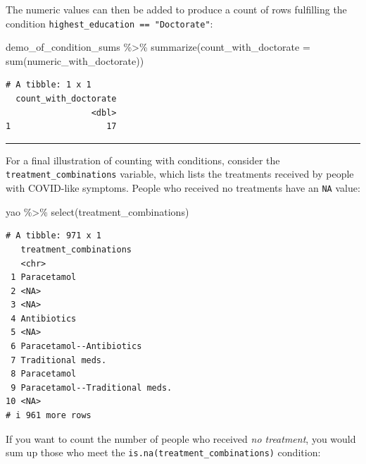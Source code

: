 \documentclass[
  letterpaper,
  DIV=11,
  numbers=noendperiod]{scrreprt}
\newenvironment{Shaded}{\begin{snugshade}}{\end{snugshade}}
\newcommand{\AttributeTok}[1]{\textcolor[rgb]{0.40,0.45,0.13}{#1}}
\newcommand{\FunctionTok}[1]{\textcolor[rgb]{0.28,0.35,0.67}{#1}}
\newcommand{\NormalTok}[1]{\textcolor[rgb]{0.00,0.23,0.31}{#1}}
\newcommand{\SpecialCharTok}[1]{\textcolor[rgb]{0.37,0.37,0.37}{#1}}
\begin{document}
\begin{tcolorbox}
The numeric values can then be added to produce a count of rows
fulfilling the condition \texttt{highest\_education\ ==\ "Doctorate"}:

\begin{Shaded}
\begin{Highlighting}[]
\NormalTok{demo\_of\_condition\_sums }\SpecialCharTok{\%\textgreater{}\%} 
  \FunctionTok{summarize}\NormalTok{(}\AttributeTok{count\_with\_doctorate =} \FunctionTok{sum}\NormalTok{(numeric\_with\_doctorate))}
\end{Highlighting}
\end{Shaded}

\begin{verbatim}
# A tibble: 1 x 1
  count_with_doctorate
                 <dbl>
1                   17
\end{verbatim}

\end{tcolorbox}

\begin{center}\rule{0.5\linewidth}{0.5pt}\end{center}

For a final illustration of counting with conditions, consider the
\texttt{treatment\_combinations} variable, which lists the treatments
received by people with COVID-like symptoms. People who received no
treatments have an \texttt{NA} value:

\begin{Shaded}
\begin{Highlighting}[]
\NormalTok{yao }\SpecialCharTok{\%\textgreater{}\%} 
  \FunctionTok{select}\NormalTok{(treatment\_combinations)}
\end{Highlighting}
\end{Shaded}

\begin{verbatim}
# A tibble: 971 x 1
   treatment_combinations        
   <chr>                         
 1 Paracetamol                   
 2 <NA>                          
 3 <NA>                          
 4 Antibiotics                   
 5 <NA>                          
 6 Paracetamol--Antibiotics      
 7 Traditional meds.             
 8 Paracetamol                   
 9 Paracetamol--Traditional meds.
10 <NA>                          
# i 961 more rows
\end{verbatim}

If you want to count the number of people who received \emph{no
treatment}, you would sum up those who meet the
\texttt{is.na(treatment\_combinations)} condition:
\end{document}
